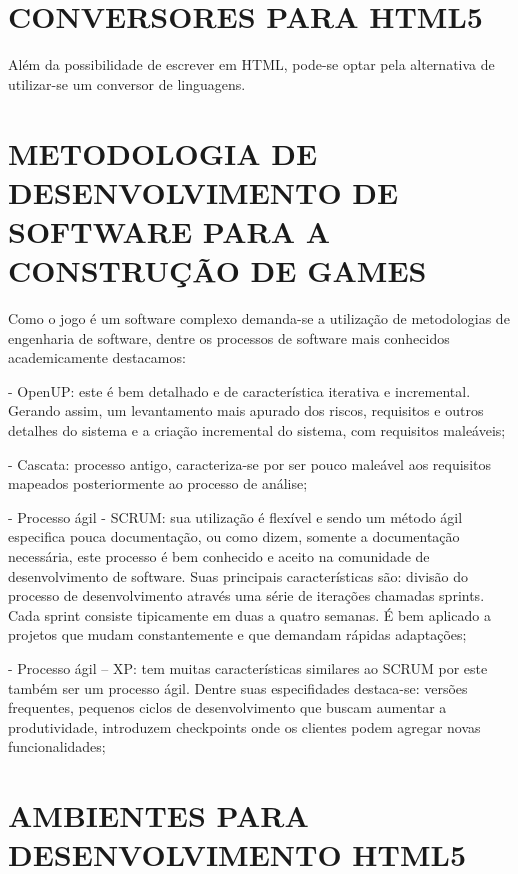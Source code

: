 \documentclass[
12pt,
a4paper,
portuges,
draft
]{report}
\begin{document}

\clearpage
\markboth{}{}
\printbibliography[heading=bibintoc,title={REFERÊNCIAS BIBLIOGRÁFICAS}]
\markboth{}{}
\appendix


\chapter{CONVERSORES PARA HTML5}
Além da possibilidade de escrever em HTML, pode-se optar pela
alternativa de utilizar-se um conversor de linguagens.

\chapter{METODOLOGIA DE DESENVOLVIMENTO DE SOFTWARE PARA A CONSTRUÇÃO DE GAMES}

Como o jogo é um software complexo demanda-se a utilização de
metodologias de engenharia de software, dentre os processos de software
mais conhecidos academicamente destacamos:

- OpenUP: este é bem detalhado e de característica iterativa e
incremental. Gerando assim, um levantamento mais apurado dos riscos,
requisitos e outros detalhes do sistema e a criação incremental do
sistema, com requisitos maleáveis;

- Cascata: processo antigo, caracteriza-se por ser pouco maleável aos
requisitos mapeados posteriormente ao processo de análise;

- Processo ágil - SCRUM: sua utilização é flexível e sendo
um método ágil especifica pouca documentação, ou como dizem,
somente a documentação necessária, este processo é bem conhecido e
aceito na comunidade de desenvolvimento de software. Suas principais
características são: divisão do processo de desenvolvimento através
uma série de iterações chamadas sprints. Cada sprint consiste
tipicamente em duas a quatro semanas. É bem aplicado a projetos que
mudam constantemente e que demandam rápidas adaptações;

- Processo ágil – XP: tem muitas características similares ao SCRUM
por este também ser um processo ágil. Dentre suas especifidades
destaca-se: versões frequentes, pequenos ciclos de desenvolvimento que
buscam aumentar a produtividade, introduzem checkpoints onde os clientes
podem agregar novas funcionalidades;

\chapter{AMBIENTES PARA DESENVOLVIMENTO HTML5}
\end{document}

